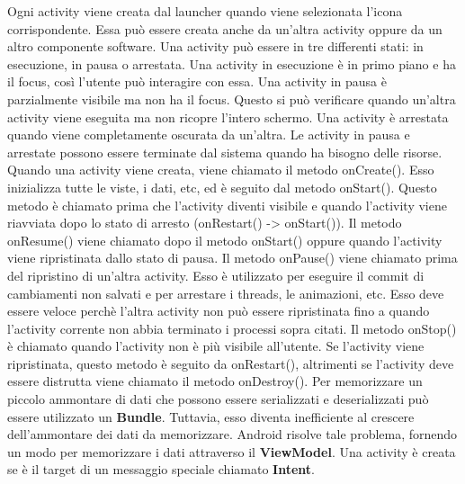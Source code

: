 Ogni activity viene creata dal launcher quando viene selezionata l'icona corrispondente.
Essa può essere creata anche da un'altra activity oppure da un altro componente software.
Una activity può essere in tre differenti stati: in esecuzione, in pausa o arrestata.
Una activity in esecuzione è in primo piano e ha il focus, così l'utente può interagire con essa.
Una activity in pausa è parzialmente visibile ma non ha il focus.
Questo si può verificare quando un'altra activity viene eseguita ma non ricopre l'intero schermo.
Una activity è arrestata quando viene completamente oscurata da un'altra.
Le activity in pausa e arrestate possono essere terminate dal sistema quando ha bisogno delle risorse.
Quando una activity viene creata, viene chiamato il metodo onCreate().
Esso inizializza tutte le viste, i dati, etc, ed è seguito dal metodo onStart().
Questo metodo è chiamato prima che l'activity diventi visibile e quando l'activity viene riavviata dopo lo stato di arresto (onRestart() -> onStart()).
Il metodo onResume() viene chiamato dopo il metodo onStart() oppure quando l'activity viene ripristinata dallo stato di pausa.
Il metodo onPause() viene chiamato prima del ripristino di un'altra activity.
Esso è utilizzato per eseguire il commit di cambiamenti non salvati e per arrestare i threads, le animazioni, etc.
Esso deve essere veloce perchè l'altra activity non può essere ripristinata fino a quando l'activity corrente non abbia terminato i processi sopra citati.
Il metodo onStop() è chiamato quando l'activity non è più visibile all'utente. Se l'activity viene ripristinata, questo metodo è seguito da onRestart(), altrimenti se l'activity deve essere distrutta viene chiamato il metodo onDestroy().
Per memorizzare un piccolo ammontare di dati che possono essere serializzati e deserializzati può essere utilizzato un \textbf{Bundle}.
Tuttavia, esso diventa inefficiente al crescere dell'ammontare dei dati da memorizzare.
Android risolve tale problema, fornendo un modo per memorizzare i dati attraverso il \textbf{ViewModel}.
Una activity è creata se è il target di un messaggio speciale chiamato \textbf{Intent}.

